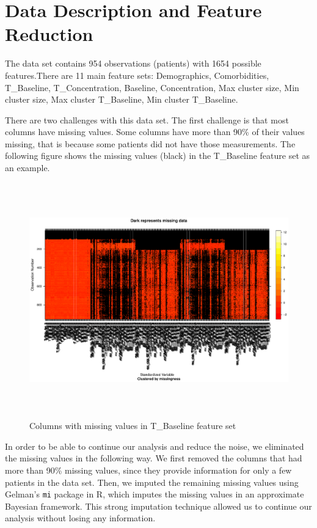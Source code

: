 \documentclass[9pt]{article}
\begin{document}
   \pagestyle{empty}


\section{Data Description and Feature Reduction}


The data set contains 954 observations (patients) with 1654 possible features.There are 11 main feature sets: Demographics, Comorbidities, T\_Baseline, T\_Concentration, Baseline, Concentration, Max cluster size, Min cluster size, Max cluster T\_Baseline, Min cluster T\_Baseline.


There are two challenges with this data set. The first challenge is that most columns have missing values. Some columns have more than 90\% of their values missing, that is because some patients did not have those measurements. The following figure shows the missing values (black) in the T\_Baseline feature set as an example.

\begin{figure}[ht]
	
	\includegraphics[width=7.3in,height=4in]{missing.pdf}
	\caption{\footnotesize Columns with missing values in T\_Baseline feature set}
\end{figure}

In order to be able to continue our analysis and reduce the noise, we eliminated the missing values in the following way. We first removed the columns that had more than 90\% missing values, since they provide information for only a few patients in the data set. Then, we imputed the remaining missing values using Gelman's \texttt{mi} package in R, which imputes the missing values in an approximate Bayesian framework. This strong imputation technique allowed us to continue our analysis without losing any information. 
\end{document}
